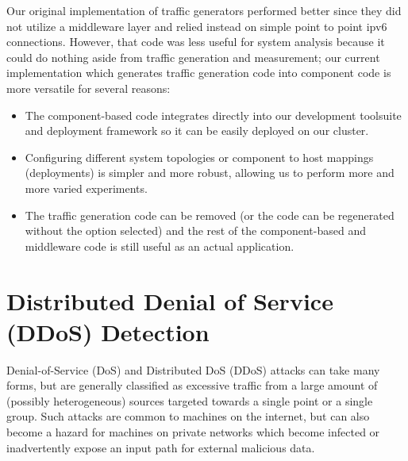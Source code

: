 \begin{definition}[Note:]
Our original implementation of traffic generators performed
	  better since they did not utilize a middleware layer and
	  relied instead on simple point to point ipv6 connections.
	  However, that code was less useful for system analysis
	  because it could do nothing aside from traffic generation
	  and measurement; our current implementation which generates
	  traffic generation code into component code is more
	  versatile for several reasons:

          \begin{itemize}
	  \item The component-based code integrates directly into our development
	    toolsuite and deployment framework so it can be easily deployed on
	    our cluster.
	  \item Configuring different system topologies or component to host
	    mappings (deployments) is simpler and more robust, allowing us to
	    perform more and more varied experiments.
	  \item The traffic generation code can be removed (or the code can be
	    regenerated without the option selected) and the rest of the
	    component-based and middleware code is still useful as an actual
	    application.
          \end{itemize}
\end{definition}

\newpage
\section{Distributed Denial of Service (DDoS) Detection}
\label{sec:ddos}

Denial-of-Service (DoS)\cite{rfc4732} and Distributed DoS (DDoS) attacks
can take many forms, but are generally classified as excessive traffic
from a large amount of (possibly heterogeneous) sources targeted
towards a single point or a single group.  Such attacks are common to
machines on the internet, but can also become a hazard for machines on
private networks which become infected or inadvertently expose an
input path for external malicious data.

